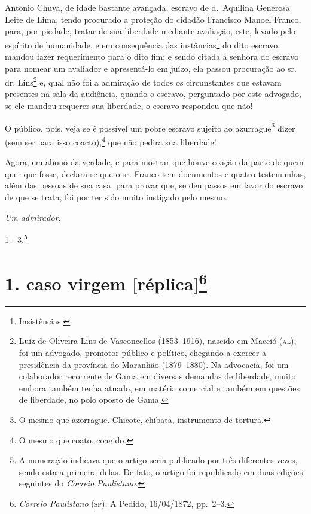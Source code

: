 {\begin{flushright}
Antonio Chuva, de idade bastante avançada, escravo de d.~Aquilina
Generosa Leite de Lima, tendo procurado a proteção do cidadão Francisco
Manoel Franco, para, por piedade, tratar de sua liberdade mediante
avaliação, este, levado pelo espírito de humanidade, e em consequência
das instâncias\footnote{ Insistências.} do dito escravo, mandou fazer
requerimento para o dito fim; e sendo citada a senhora do escravo para
nomear um avaliador e apresentá-lo em juízo, ela passou procuração ao
sr. dr. Lins\footnote{ Luiz de Oliveira Lins de Vasconcellos
  (1853--1916), nascido em Maceió (\textsc{al}), foi um advogado, promotor público
  e político, chegando a exercer a presidência da província do Maranhão
  (1879--1880). Na advocacia, foi um colaborador recorrente de Gama em
  diversas demandas de liberdade, muito embora também tenha atuado, em
  matéria comercial e também em questões de liberdade, no polo oposto de
  Gama.} e, qual não foi a admiração de todos os circunstantes que
estavam presentes na sala da audiência, quando o escravo, perguntado por
este advogado, se ele mandou requerer sua liberdade, o escravo respondeu
que não!

O público, pois, veja se é possível um pobre escravo sujeito ao
azurrague\footnote{ O mesmo que azorrague. Chicote, chibata,
  instrumento de tortura.} dizer (sem ser para isso coacto),\footnote{
  O mesmo que coato, coagido.} que não pedira sua liberdade!

Agora, em abono da verdade, e para mostrar que houve coação da parte de
quem quer que fosse, declara-se que o sr. Franco tem documentos e quatro
testemunhas, além das pessoas de sua casa, para provar que, se deu
passos em favor do escravo de que se trata, foi por ter sido muito
instigado pelo mesmo.

\emph{Um admirador}.

1 - 3.\footnote{ A numeração indicava que o artigo seria publicado por
  três diferentes vezes, sendo esta a primeira delas. De fato, o artigo
  foi republicado em duas edições seguintes do \emph{Correio
  Paulistano}.}

\chapter{1. caso virgem {[}réplica{]}\footnote{\emph{Correio Paulistano} (\textsc{sp}), A Pedido, 16/04/1872,
  pp.~2--3.}} %


\end{flushright}}
